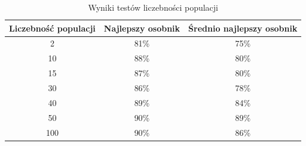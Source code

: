 \begin{table}[H]
    \centering
    \begin{tabular}{|c|c|c|}
    \hline
    Liczebność populacji    & Najlepszy osobnik & Średnio najlepszy osobnik \\ \hline
    2                       & 81\%              & 75\%                      \\ \hline
    10                      & 88\%              & 80\%                      \\ \hline
    15                      & 87\%              & 80\%                      \\ \hline
    30                      & 86\%              & 78\%                      \\ \hline
    40                      & 89\%              & 84\%                      \\ \hline
    50                      & 90\%              & 89\%                      \\ \hline
    100                     & 90\%              & 86\%                      \\ \hline
    \end{tabular}
    \caption{Wyniki testów liczebności populacji}
    \label{tab:crossing}
\end{table}

